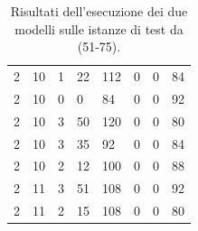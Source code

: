 \documentclass[12pt, italian, openany]{book}
\begin{document}
\begin{table}[]
\begin{tabular}{ll|lll|lll}
2           & 10           & 1    & 22        & 112   & 0    & 0         & 84   \\
2           & 10           & 0    & 0         & 84    & 0    & 0         & 92   \\
2           & 10           & 3    & 50        & 120   & 0    & 0         & 80   \\
2           & 10           & 3    & 35        & 92    & 0    & 0         & 84   \\
2           & 10           & 2    & 12        & 100   & 0    & 0         & 88   \\
2           & 11           & 3    & 51        & 108   & 0    & 0         & 92   \\
2           & 11           & 2    & 15        & 108   & 0    & 0         & 80   \\ \hline
\end{tabular}
\caption{Risultati dell'esecuzione dei due modelli sulle istanze di test da (51-75).}
\label{res3}
\end{table}
\end{document}
